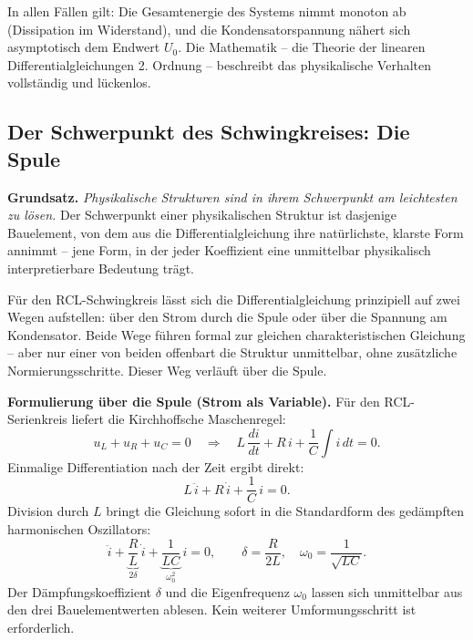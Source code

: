 ﻿\documentclass[12pt, a4paper]{article}
\begin{document}
	In allen Fällen gilt: Die Gesamtenergie des Systems nimmt monoton ab (Dissipation im Widerstand), und die Kondensatorspannung nähert sich asymptotisch dem Endwert $U_0$. Die Mathematik -- die Theorie der linearen Differentialgleichungen 2. Ordnung -- beschreibt das physikalische Verhalten vollständig und lückenlos.

	\subsection{Der Schwerpunkt des Schwingkreises: Die Spule}

	\textbf{Grundsatz.} \textit{Physikalische Strukturen sind in ihrem Schwerpunkt am leichtesten zu lösen.} Der Schwerpunkt einer physikalischen Struktur ist dasjenige Bauelement, von dem aus die Differentialgleichung ihre natürlichste, klarste Form annimmt -- jene Form, in der jeder Koeffizient eine unmittelbar physikalisch interpretierbare Bedeutung trägt.

	Für den RCL-Schwingkreis lässt sich die Differentialgleichung prinzipiell auf zwei Wegen aufstellen: über den Strom durch die Spule oder über die Spannung am Kondensator. Beide Wege führen formal zur gleichen charakteristischen Gleichung -- aber nur einer von beiden offenbart die Struktur unmittelbar, ohne zusätzliche Normierungsschritte. Dieser Weg verläuft über die Spule.

	\textbf{Formulierung über die Spule (Strom als Variable).}
	Für den RCL-Serienkreis liefert die Kirchhoffsche Maschenregel:
	\begin{equation}
		u_L + u_R + u_C = 0
		\quad \Longrightarrow \quad
		L\,\frac{di}{dt} + R\,i + \frac{1}{C}\int i\,dt = 0.
	\end{equation}
	Einmalige Differentiation nach der Zeit ergibt direkt:
	\begin{equation}
		L\,\ddot{i} + R\,\dot{i} + \frac{1}{C}\,i = 0.
		\label{eq:rlc_spule}
	\end{equation}
	Division durch $L$ bringt die Gleichung sofort in die Standardform des gedämpften harmonischen Oszillators:
	\begin{equation}
		\ddot{i} + \underbrace{\frac{R}{L}}_{2\delta}\,\dot{i} + \underbrace{\frac{1}{LC}}_{\omega_0^2}\,i = 0,
		\qquad \delta = \frac{R}{2L},\quad \omega_0 = \frac{1}{\sqrt{LC}}.
		\label{eq:rlc_standardform}
	\end{equation}
	Der Dämpfungskoeffizient $\delta$ und die Eigenfrequenz $\omega_0$ lassen sich unmittelbar aus den drei Bauelementwerten ablesen. Kein weiterer Umformungsschritt ist erforderlich.
\end{document}
